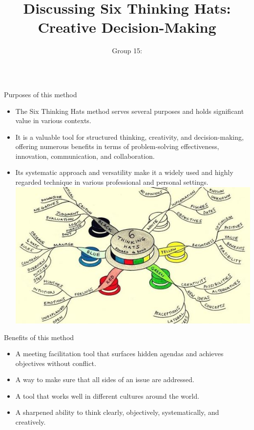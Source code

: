 \documentclass{beamer}
\author[Ruibo Gai]{Group 15:}
\title{Discussing Six Thinking Hats:\\ Creative Decision-Making}
\institute{Tianchen Yan}
\begin{document}
\begin{frame}[fragile]
\begin{columns}[T]

\begin{column}{.33\textwidth}
\begin{block}{Purposes of this method}
\begin{itemize}
\item The Six Thinking Hats method serves several purposes and holds significant value in various contexts. 
\item It is a valuable tool for structured thinking, creativity, and decision-making, offering numerous benefits in terms of problem-solving effectiveness, innovation, communication, and collaboration.
\item Its systematic approach and versatility make it a widely used and highly regarded technique in various professional and personal settings.
\includegraphics[width=.8\linewidth]{branches.jpg}
\end{itemize}
\end{block}


\begin{block}{Benefits of this method}
\begin{itemize}
\item A meeting facilitation tool that surfaces hidden agendas and achieves objectives without conflict.
\item A way to make sure that all sides of an issue are addressed.
\item A tool that works well in different cultures around the world.
\item A sharpened ability to think clearly, objectively, systematically, and creatively.
\end{itemize}
\end{block}
\end{column}


\end{columns}
\end{frame}
\end{document}
